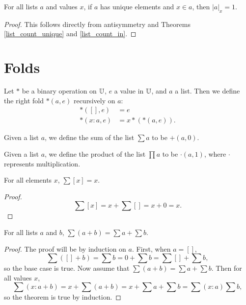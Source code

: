 \documentclass[../../math.tex]{subfiles}
\begin{document}
\begin{theorem} \label{list_count_in_unique}
    For all lists $a$ and values $x$, if $a$ has unique elements and $x \in a$,
    then $|a|_x = 1$.
\end{theorem}
\begin{proof}
    This follows directly from antisymmetry and Theorems \ref{list_count_unique}
    and \ref{list_count_in}.
\end{proof}

\section{Folds}

\begin{definition}
    Let $*$ be a binary operation on $\mathbb{U}$, $e$ a value in $\mathbb{U}$, and $a$ a list.
    Then we define the right fold $*(a, e)$ recursively on $a$:
    \begin{align*}
           *([], e) &= e \\
        *(x : a, e) &= x * (*(a, e)).
    \end{align*}
\end{definition}

\begin{definition}
    Given a list $a$, we define the sum of the list $\sum a$ to be $+(a, 0)$.
\end{definition}

\begin{definition}
    Given a list $a$, we define the product of the list $\prod a$ to be
    $\cdot(a, 1)$, where $\cdot$ represents multiplication.
\end{definition}

\begin{theorem}
    For all elements $x$, $\sum [x] = x$.
\end{theorem}
\begin{proof}
    \[
        \sum [x] = x + \sum [] = x + 0 = x.
    \]
\end{proof}

\begin{theorem} \label{list_sum_conc}
    For all lists $a$ and $b$, $\sum (a + b) = \sum a + \sum b$.
\end{theorem}
\begin{proof}
    The proof will be by induction on $a$.  First, when $a = []$,
    \[
        \sum ([] + b) = \sum b = 0 + \sum b = \sum [] + \sum b,
    \]
    so the base case is true.  Now assume that $\sum (a + b) = \sum a + \sum b.$
    Then for all values $x$,
    \[
        \sum(x : a + b) = x + \sum(a + b) = x + \sum a + \sum b = \sum (x : a)
        \sum b,
    \]
    so the theorem is true by induction.
\end{proof}
\end{document}
